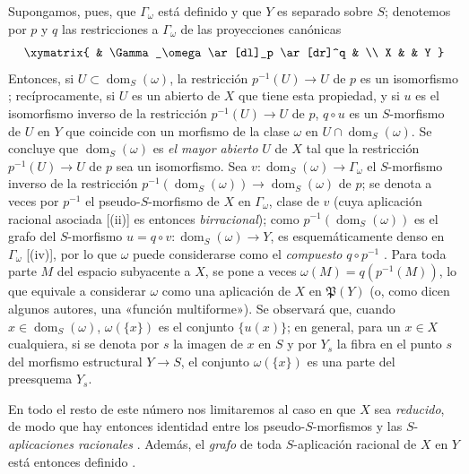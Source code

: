 \begin{env}[20.4.2]
\label{IV.20.4.2}
Supongamos, pues, que $\Gamma_\omega$ está definido y que $Y$ es separado sobre $S$; denotemos por $p$ y $q$ las restricciones a $\Gamma_\omega$ de las proyecciones canónicas
\[
  \xymatrix{
  & \Gamma_\omega \ar[dl]_p \ar[dr]^q & \\
  X & & Y
  }
\]
Entonces, si $U\subset\operatorname{dom}_S(\omega)$, la restricción $p^{-1}(U)\to U$ de $p$ es un isomorfismo ; recíprocamente, si $U$ es un abierto de $X$ que tiene esta propiedad, y si $u$ es el isomorfismo inverso de la restricción $p^{-1}(U)\to U$ de $p$, $q\circ u$ es un $S$-morfismo de $U$ en $Y$ que coincide con un morfismo de la clase $\omega$ en $U\cap\operatorname{dom}_S(\omega)$.
Se concluye que $\operatorname{dom}_S(\omega)$ es \emph{el mayor abierto} $U$ de $X$ tal que la restricción $p^{-1}(U)\to U$ de $p$ sea un
isomorfismo.
Sea $v:\operatorname{dom}_S(\omega)\to\Gamma_\omega$ el $S$-morfismo inverso de la restricción $p^{-1}(\operatorname{dom}_S(\omega))\to\operatorname{dom}_S(\omega)$ de $p$; se denota a veces por $p^{-1}$ el pseudo-$S$-morfismo de $X$ en $\Gamma_\omega$, clase de $v$ (cuya aplicación racional asociada [(ii)] es entonces \emph{birracional}); como $p^{-1}(\operatorname{dom}_S(\omega))$ es el grafo del $S$-morfismo $u=q\circ v:\operatorname{dom}_S(\omega)\to Y$, es esquemáticamente denso en $\Gamma_\omega$ [(iv)], por lo que $\omega$ puede considerarse como el \emph{compuesto} $q\circ p^{-1}$ .
Para toda parte $M$ del espacio subyacente a $X$, se pone a veces $\omega(M)=q(p^{-1}(M))$, lo que equivale a considerar $\omega$ como una aplicación de $X$ en $\mathfrak{P}(Y)$ (o, como dicen algunos autores, una «función multiforme»).
Se observará que, cuando $x\in\operatorname{dom}_S(\omega)$, $\omega(\{x\})$ es el conjunto $\{u(x)\}$; en general, para un $x\in X$ cualquiera, si se denota por $s$ la imagen de $x$ en $S$ y por $Y_s$ la fibra en el punto $s$ del morfismo estructural $Y\to S$, el conjunto $\omega(\{x\})$ es una parte del preesquema $Y_s$.
\end{env}

\begin{env}[20.4.3]
\label{IV.20.4.3}
En todo el resto de este número nos limitaremos al caso en que $X$ sea \emph{reducido}, de modo que hay entonces identidad entre los pseudo-$S$-morfismos y las $S$-\emph{aplicaciones racionales} .
Además, el \emph{grafo} de toda $S$-aplicación racional de $X$ en $Y$ está entonces definido .
\end{env}

